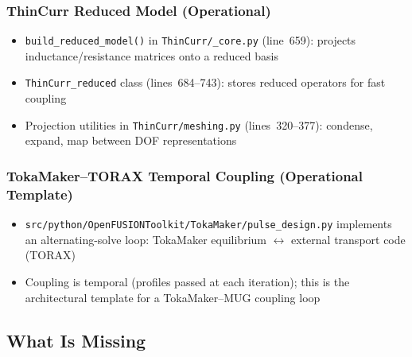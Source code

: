 \documentclass[11pt,letterpaper]{article}
\begin{document}
\subsubsection{ThinCurr Reduced Model (Operational)}

\begin{itemize}
  \item \texttt{build\_reduced\_model()} in \texttt{ThinCurr/\_core.py}
    (line~659): projects inductance/resistance matrices onto a reduced basis
  \item \texttt{ThinCurr\_reduced} class (lines~684--743): stores reduced
    operators for fast coupling
  \item Projection utilities in \texttt{ThinCurr/meshing.py}
    (lines~320--377): condense, expand, map between DOF representations
\end{itemize}

\subsubsection{TokaMaker--TORAX Temporal Coupling (Operational Template)}

\begin{itemize}
  \item \texttt{src/python/OpenFUSIONToolkit/TokaMaker/pulse\_design.py}
    implements an alternating-solve loop: TokaMaker equilibrium $\leftrightarrow$
    external transport code (TORAX)
  \item Coupling is temporal (profiles passed at each iteration); this is the
    architectural template for a TokaMaker--MUG coupling loop
\end{itemize}

\subsection{What Is Missing}
\end{document}

